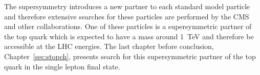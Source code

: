 The supersymmetry introduces a new partner to each standard model particle and therefore extensive searches for these particles are performed by the CMS and other collaborations. One of these particles is a supersymmetric partner of the top quark which is expected to have a mass around 1~TeV and therefore be accessible at the LHC energies. The last chapter before conclusion, Chapter~\ref{sec:stopch},  presents search for this supersymmetric partner of the top quark in the single lepton final state.






